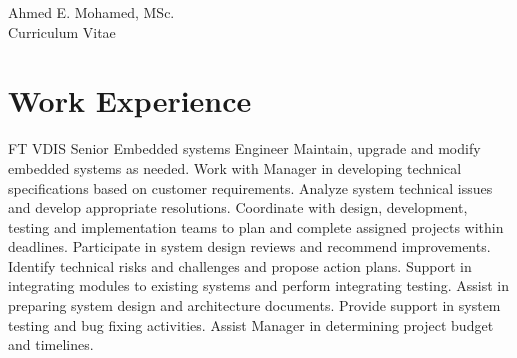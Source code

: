 \documentclass[10pt]{article} %
\begin{document}
\begin{paracol}{2} %


\parbox[top][0.12\textheight][c]{\linewidth}{ %
	\vspace{-0.04\textheight} %
	\centering %
	{\sffamily\Huge Ahmed E. Mohamed, MSc.}\\\medskip %
	{\Huge\color{headings}\cvtextfont Curriculum Vitae}
}


\section{Work Experience}





{FT} %
{VDIS} %
{Senior Embedded systems Engineer} %
{Maintain, upgrade and modify embedded systems as needed.
Work with Manager in developing technical specifications based on customer requirements.
Analyze system technical issues and develop appropriate resolutions.
Coordinate with design, development, testing and implementation teams to plan and complete assigned projects within deadlines.
Participate in system design reviews and recommend improvements.
Identify technical risks and challenges and propose action plans.
Support in integrating modules to existing systems and perform integrating testing.
Assist in preparing system design and architecture documents.
Provide support in system testing and bug fixing activities.
Assist Manager in determining project budget and timelines.} %


\end{paracol}
\end{document}
